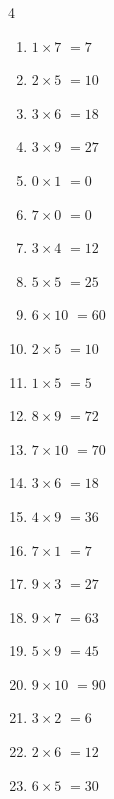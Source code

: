 \begin{multicols}{4}
\begin{enumerate}
  \item $1\times 7$
        $=7$

  \item $2\times 5$
        $=10$

  \item $3\times 6$
        $=18$

  \item $3\times 9$
        $=27$

  \item $0\times 1$
        $=0$

\columnbreak %

  \item $7\times 0$
        $=0$

  \item $3\times 4$
        $=12$

  \item $5\times 5$
        $=25$

  \item $6\times 10$
        $=60$

  \item $2\times 5$
        $=10$

  \item $1\times 5$
        $=5$

  \item $8\times 9$
        $=72$

  \item $7\times 10$
        $=70$

  \item $3\times 6$
        $=18$

  \item $4\times 9$
        $=36$

  \item $7\times 1$
        $=7$

  \item $9\times 3$
        $=27$

  \item $9\times 7$
        $=63$

  \item $5\times 9$
        $=45$

  \item $9\times 10$
        $=90$

  \item $3\times 2$
        $=6$

  \item $2\times 6$
        $=12$

  \item $6\times 5$
        $=30$


\end{enumerate}
\end{multicols}
